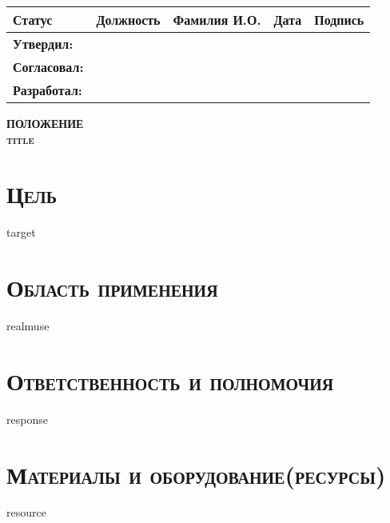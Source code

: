 {{{{{{{\vspace{2mm}
\begin{tabu} to \textwidth { |X|X|X|X|X|   }
\hline
\textbf{Статус} & \textbf{Должность} & \textbf{Фамилия И.О.}& \textbf{Дата} & \textbf{Подпись} \\  [1ex] \hline
\textbf{Утвердил:}    & \approverPost{}  & \varApprover{}   & \varDateapprove{}   &  \\  [2ex] \hline
\textbf{Согласовал:}   & \visantPost{}    & \varVisant{}    & \varDatevise{}      &  \\  [2ex] \hline
\textbf{Разработал:}   & \initiatorPost{} & \varInitiator{} & \varDatecreation{}  &  \\  [2ex] \hline
\end{tabu}

\pagebreak

\pagestyle{firstpage}

\vspace{1cm}

\tableofcontents

\vfill

\pagebreak

\pagestyle{maintext}

\begin{center}
\Large \textbf{\textsc{ПОЛОЖЕНИЕ}} \\
\vspace{1mm}
\Large \textbf{\textsc{ {{title}} }} \\
\end{center}

\begin{flushleft}

\section{\large \textbf{\textsc{Цель}}}
{{target}}

\section{\large \textbf{\textsc{Область применения}}}
{{realmuse}}

\section{\large \textbf{\textsc{Ответственность и полномочия}}}
{{response}}

\section{\large \textbf{\textsc{Материалы и оборудование(ресурсы)}}}
{{resource}}


\end{flushleft}}}}}}}}
